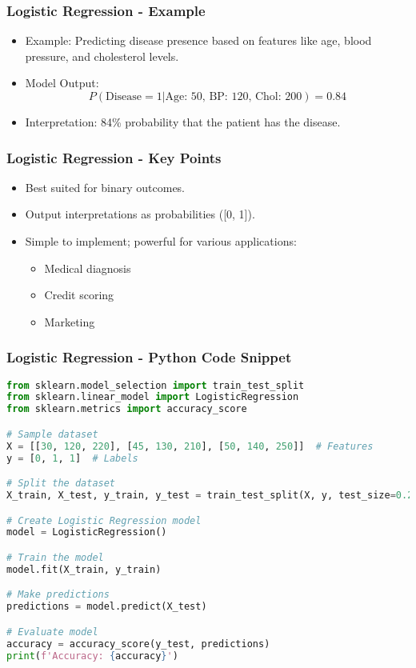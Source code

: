 \documentclass[aspectratio=169]{beamer}
\begin{document}
\begin{frame}[fragile]
    \frametitle{Logistic Regression - Example}
    \begin{itemize}
        \item Example: Predicting disease presence based on features like age, blood pressure, and cholesterol levels.
        \item Model Output:
            \begin{equation}
            P(\text{Disease} = 1 | \text{Age: 50, BP: 120, Chol: 200}) = 0.84
            \end{equation}
        \item Interpretation: 84\% probability that the patient has the disease.
    \end{itemize}
\end{frame}

\begin{frame}[fragile]
    \frametitle{Logistic Regression - Key Points}
    \begin{itemize}
        \item Best suited for binary outcomes.
        \item Output interpretations as probabilities ([0, 1]).
        \item Simple to implement; powerful for various applications:
            \begin{itemize}
                \item Medical diagnosis
                \item Credit scoring
                \item Marketing
            \end{itemize}
    \end{itemize}
\end{frame}

\begin{frame}[fragile]
    \frametitle{Logistic Regression - Python Code Snippet}
    \begin{lstlisting}[language=Python]
from sklearn.model_selection import train_test_split
from sklearn.linear_model import LogisticRegression
from sklearn.metrics import accuracy_score

# Sample dataset
X = [[30, 120, 220], [45, 130, 210], [50, 140, 250]]  # Features
y = [0, 1, 1]  # Labels

# Split the dataset
X_train, X_test, y_train, y_test = train_test_split(X, y, test_size=0.2, random_state=42)

# Create Logistic Regression model
model = LogisticRegression()

# Train the model
model.fit(X_train, y_train)

# Make predictions
predictions = model.predict(X_test)

# Evaluate model
accuracy = accuracy_score(y_test, predictions)
print(f'Accuracy: {accuracy}')
    \end{lstlisting}
\end{frame}
\end{document}
